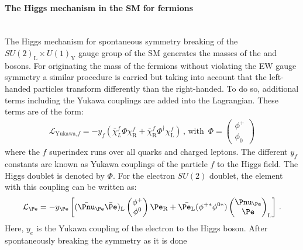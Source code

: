 \paragraph{The Higgs mechanism in the SM for fermions}\mbox{}\\ %
The Higgs mechanism for spontaneous symmetry breaking of the $SU(2)_\text{L} \times U(1)_\text{Y}$ gauge group of the SM generates the masses of the \PWpm and \PZ bosons.
For originating the mass of the fermions without violating the EW gauge symmetry a similar procedure is carried but taking into account that the left-handed particles transform differently 
than the right-handed. To do so, additional terms including the Yukawa couplings are added into the Lagrangian. These terms are of the form:
\begin{align*}
\mathcal{L}_{\text{Yukawa,} f}=-y_{f}(\bar{\chi}_{L}^f \Phi \chi_\text{R}^{f} + \bar{\chi}_{\text{R}}^f \Phi^{\dagger} \chi_\text{L}^{f} )\, \text{, with }\, \Phi = \begin{pmatrix} \phi^+ \\ \phi_0 \end{pmatrix} 
\end{align*}
where the $f$ superindex runs over all quarks and charged leptons. %
The different $y_f$ constants are known as Yukawa couplings of the particle $f$ to the Higgs field. The Higgs doublet is denoted by $\Phi$.
For the electron $SU(2)$ doublet, the element with this coupling can be written as:
\begin{equation}\label{eq:chap1:HiggsMechanism:ElectronDoubletLagrangian}
\mathcal{L}_{\Pe} = - y_{\Pe} \left[ (\bar{\Pnu}_{\Pe} \bar{\Pe})_{\text{L}} \begin{pmatrix} \phi^{+} \\ \phi^{0} \end{pmatrix} \Pe_{\text{R}} + \bar{\Pe_{\text{L}}} (\phi^{+*} \phi^{0*})\begin{pmatrix} \Pnu_{\Pe} \\ \Pe \end{pmatrix}_{\text{L}} \right] \, .
\end{equation}
Here, $y_{e}$ is the Yukawa coupling of the electron to the Higgs boson. 
After spontaneously breaking the symmetry as it is done 
